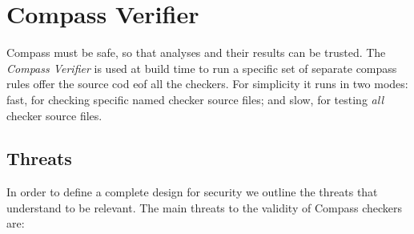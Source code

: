 \section{Compass Verifier}

Compass must be safe, so that analyses and their results can be trusted. 
The {\em Compass Verifier} is used at build time to run a specific set of separate 
compass rules offer the source cod eof all the checkers.  For simplicity it runs in two
modes: fast, for checking specific named checker source files; and slow, for testing 
{\em all} checker source files.

\subsection{Threats} 

In order to define a complete design for security we outline the threats that
understand to be relevant. The main threats to the validity of Compass checkers are:
